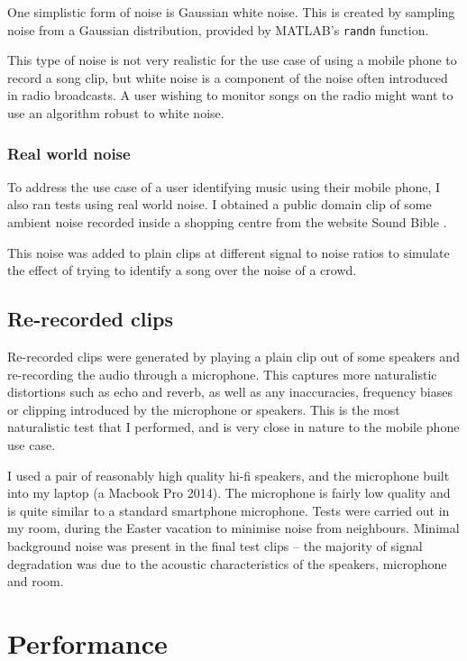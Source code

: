 \documentclass[12pt,a4paper,twoside,openright]{report}
\begin{document}
One simplistic form of noise is Gaussian white noise. This is created by sampling noise from a Gaussian distribution, provided by MATLAB's \lstinline{randn} function.

This type of noise is not very realistic for the use case of using a mobile phone to record a song clip, but white noise is a component of the noise often introduced in radio broadcasts. A user wishing to monitor songs on the radio might want to use an algorithm robust to white noise.


\subsubsection{Real world noise}

To address the use case of a user identifying music using their mobile phone, I also ran tests using real world noise. I obtained a public domain clip of some ambient noise recorded inside a shopping centre from the website Sound Bible \cite{ShoppingAmbience}.

This noise was added to plain clips at different signal to noise ratios to simulate the effect of trying to identify a song over the noise of a crowd.


\subsection{Re-recorded clips}

Re-recorded clips were generated by playing a plain clip out of some speakers and re-recording the audio through a microphone. This captures more naturalistic distortions such as echo and reverb, as well as any inaccuracies, frequency biases or clipping introduced by the microphone or speakers. This is the most naturalistic test that I performed, and is very close in nature to the mobile phone use case.

I used a pair of reasonably high quality hi-fi speakers, and the microphone built into my laptop (a Macbook Pro 2014). The microphone is fairly low quality and is quite similar to a standard smartphone microphone. Tests were carried out in my room, during the Easter vacation to minimise noise from neighbours. Minimal background noise was present in the final test clips -- the majority of signal degradation was due to the acoustic characteristics of the speakers, microphone and room.



\section{Performance}
\end{document}

